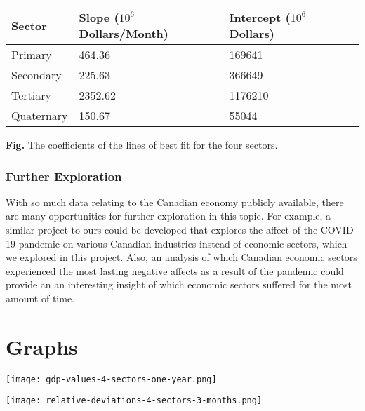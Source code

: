 \documentclass[fontsize=11pt]{article}
\begin{document}
\medskip

    \begin{tabular}{|l|l|l|l|}
    \hline
    Sector & Slope ($10^6$ Dollars/Month) & Intercept ($10^6$ Dollars)\\
    \hline
    Primary & 464.36 & 169641\\
    Secondary & 225.63 & 366649\\
    Tertiary & 2352.62 & 1176210\\
    Quaternary & 150.67 & 55044\\
    \hline
    \end{tabular}

\medskip

\textbf{Fig.} The coefficients of the lines of best fit for the four sectors.

\subsubsection*{Further Exploration}

With so much data relating to the Canadian economy publicly available, there are many opportunities for further exploration in this topic. For example, a similar project to ours could be developed that explores the affect of the COVID-19 pandemic on various Canadian industries instead of economic sectors, which we explored in this project. Also, an analysis of which Canadian economic sectors experienced the most lasting negative affects as a result of the pandemic could provide an an interesting insight of which economic sectors suffered for the most amount of time.  


\newpage

\section*{Graphs}

\begin{center}
\texttt{[image: gdp-values-4-sectors-one-year.png]}
\end{center}


\begin{center}
\texttt{[image: relative-deviations-4-sectors-3-months.png]}
\end{center}
\end{document}
